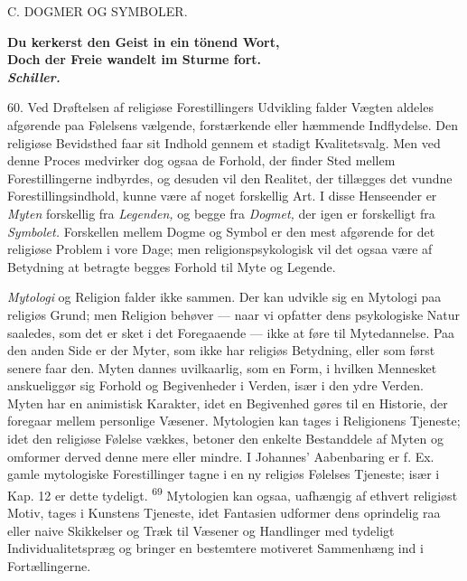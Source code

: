 \documentclass[12pt,a4paper,openany]{book}
\newcommand{\opage}[1]{\marginnote{\footnotesize\textit{[#1]}}}
\begin{document}
\clearpage

\opage{133}\begin{center}C. DOGMER OG SYMBOLER.\end{center}

\begin{flushright}\begin{minipage}{0.55\textwidth}\small\bfseries
Du kerkerst den Geist in ein tönend Wort,\\
Doch der Freie wandelt im Sturme fort.\\
\hfill\textit{Schiller.}
\end{minipage}\end{flushright}

60. Ved Drøftelsen af religiøse Forestillingers Udvikling falder Vægten
aldeles afgørende paa Følelsens vælgende, forstærkende eller hæmmende
Indflydelse. Den religiøse Bevidsthed faar sit Indhold gennem et stadigt
Kvalitetsvalg. Men ved denne Proces medvirker dog ogsaa de Forhold, der
finder Sted mellem Forestillingerne indbyrdes, og desuden vil den
Realitet, der tillægges det vundne Forestillingsindhold, kunne være af
noget forskellig Art. I disse Henseender er \textit{Myten} forskellig
fra \textit{Legenden,} og begge fra \textit{Dogmet,} der igen er
forskelligt fra \textit{Symbolet.} Forskellen mellem Dogme og Symbol er
den mest afgørende for det religiøse Problem i vore Dage; men
religionspsykologisk vil det ogsaa være af Betydning at betragte begges
Forhold til Myte og Legende.

\textit{Mytologi} og Religion falder ikke sammen. Der kan udvikle sig en
Mytologi paa religiøs Grund; men Religion behøver --- naar vi opfatter
dens psykologiske Natur saaledes, som det er sket i det Foregaaende ---
ikke at føre til Mytedannelse. Paa den anden Side er der Myter, som ikke
har religiøs Betydning, eller som først senere faar den. Myten dannes
uvilkaarlig, som en Form, i hvilken Mennesket anskueliggør sig Forhold
og Begivenheder i Verden, især i den ydre Verden. Myten har en
animistisk Karakter, idet en Begivenhed gøres til en Historie, der
foregaar mellem personlige Væsener. Mytologien kan tages i Religionens
Tjeneste; idet den religiøse Følelse vækkes, betoner den enkelte
Bestanddele af Myten og omformer derved denne mere eller mindre. I
Johannes’ Aabenbaring er f. Ex. gamle mytologiske Forestillinger tagne i
en ny religiøs Følelses Tjeneste; især i Kap. 12 er dette tydeligt.
\textsuperscript{69} Mytologien kan ogsaa, uafhængig af ethvert
religiøst Motiv, tages i Kunstens Tjeneste, idet Fantasien udformer dens
oprindelig raa eller naive Skikkelser og Træk til Væsener og
\opage{134}Handlinger med tydeligt Individualitetspræg og bringer en
bestemtere motiveret Sammenhæng ind i Fortællingerne.
\end{document}
